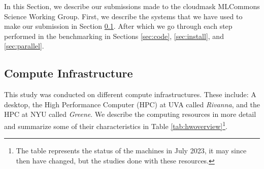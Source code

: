 \documentclass[sigplan,screen]{acmart}
\begin{document}
In this Section, we describe our submissions made to the cloudmask MLCommons Science Working Group. First, we describe the systems that we have used to make our submission in Section \ref{sec:hw}. After which we go through each step performed in the benchmarking in Sections \ref{sec:code}, \ref{sec:install}, and \ref{sec:parallel}.

\subsection{Compute Infrastructure}
\label{sec:hw}

This study was conducted on different compute infrastructures. These include: A desktop, the High Performance Computer (HPC) at UVA called {\em Rivanna}, and the HPC at NYU called {\em Greene}. We describe the computing resources in more detail and summarize some of their characteristics in Table \ref{tab:hwoverview}\footnote{The table represents the status of the machines in July 2023, it may since then have changed, but the studies done with these resources.}.
\end{document}
